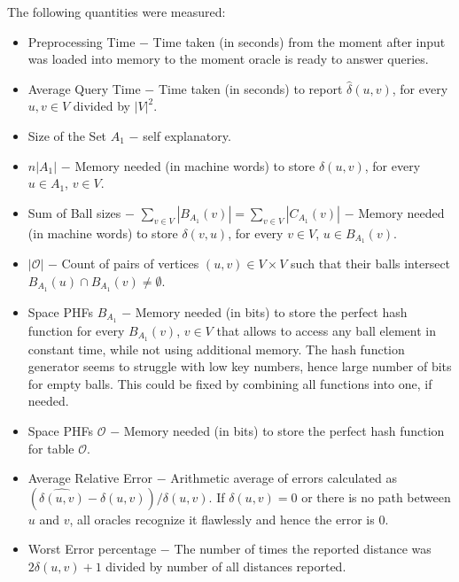 \documentclass[shortabstract, lic, english]{iithesis}
\theoremstyle{definition} \newtheorem{definition}{Definition}[chapter]
\theoremstyle{plain} \newtheorem{remark}[definition]{Observation}
\theoremstyle{plain} \newtheorem{theorem}[definition]{Theorem}
\theoremstyle{plain} \newtheorem{lemma}[definition]{Lemma}
\theoremstyle{plain} \newtheorem{conjecture}[definition]{Conjecture}
\begin{document}
The following quantities were measured:
\begin{itemize}
    \item Preprocessing Time $-$ Time taken (in seconds) from the moment after input was loaded into memory to the moment oracle is ready to answer queries.
    \item Average Query Time $-$ Time taken (in seconds) to report $\hat{\delta}(u, v)$, for every $u, v \in V$ divided by $|V|^2$.
    \item Size of the Set $A_1$ $-$ self explanatory.
    \item $n|A_1|$ $-$ Memory needed (in machine words) to store $\delta(u, v)$, for every $u \in A_1$, $v \in V$.
    \item Sum of Ball sizes $-$ $\sum_{v \in V} |B_{A_1}(v)| = \sum_{v \in V} |C_{A_1}(v)|$ $-$ Memory needed (in machine words) to store $\delta(v, u)$, for every $v \in V$, $u \in B_{A_1}(v)$.
    \item $|\mathcal{O}|$ $-$ Count of pairs of vertices $(u,v) \in V \times V$ such that their balls intersect $B_{A_1}(u) \cap B_{A_1}(v) \neq \emptyset$.
    \item Space PHFs $B_{A_1}$ $-$ Memory needed (in bits) to store the perfect hash function for every $B_{A_1}(v)$, $v \in V$ that allows to access any ball element in constant time, while not using additional memory. 
            The hash function generator seems to struggle with low key numbers, hence large number of bits for empty balls. This could be fixed by combining all functions into one, if needed.
    \item Space PHFs $\mathcal{O}$  $-$ Memory needed (in bits) to store the perfect hash function for table $\mathcal{O}$.
    \item Average Relative Error $-$ Arithmetic average of errors calculated\newline 
            as $(\hat{\delta(u,v)} - \delta(u,v)) / \delta(u,v)$.
            If $\delta(u,v) = 0$ or there is no path between $u$ and $v$, all oracles recognize it flawlessly and hence the error is $0$.
    \item Worst Error percentage $-$ The number of times the reported distance was $2\delta(u, v) + 1$ divided by number of all distances reported.
\end{itemize}
\end{document}
